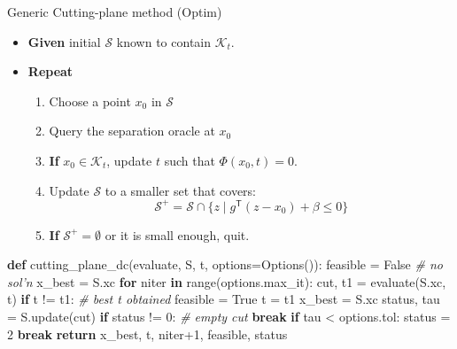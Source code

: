 \documentclass[
  ignorenonframetext,
  aspectratio=169,
  serif,onlymath]{beamer}
\newenvironment{Shaded}{}{}
\newcommand{\BuiltInTok}[1]{#1}
\newcommand{\CommentTok}[1]{\textcolor[rgb]{0.38,0.63,0.69}{\textit{#1}}}
\newcommand{\ControlFlowTok}[1]{\textcolor[rgb]{0.00,0.44,0.13}{\textbf{#1}}}
\newcommand{\DecValTok}[1]{\textcolor[rgb]{0.25,0.63,0.44}{#1}}
\newcommand{\KeywordTok}[1]{\textcolor[rgb]{0.00,0.44,0.13}{\textbf{#1}}}
\newcommand{\NormalTok}[1]{#1}
\newcommand{\OperatorTok}[1]{\textcolor[rgb]{0.40,0.40,0.40}{#1}}
\newcommand{\VariableTok}[1]{\textcolor[rgb]{0.10,0.09,0.49}{#1}}
\providecommand{\tightlist}{%
  \setlength{\itemsep}{0pt}\setlength{\parskip}{0pt}}
\begin{document}
\begin{frame}{Generic Cutting-plane method (Optim)}
\protect\hypertarget{generic-cutting-plane-method-optim}{}

\begin{itemize}
\tightlist
\item
  \textbf{Given} initial \(\mathcal{S}\) known to contain
  \(\mathcal{K}_t\).
\item
  \textbf{Repeat}

  \begin{enumerate}
  \tightlist
  \item
    Choose a point \(x_0\) in \(\mathcal{S}\)
  \item
    Query the separation oracle at \(x_0\)
  \item
    \textbf{If} \(x_0 \in \mathcal{K}_t\), update \(t\) such that
    \(\Phi(x_0, t) = 0\).
  \item
    Update \(\mathcal{S}\) to a smaller set that covers:
    \[\mathcal{S}^+ = \mathcal{S} \cap \{z \mid g^\mathsf{T} (z - x_0) + \beta \le 0\} \]
  \item
    \textbf{If} \(\mathcal{S}^+ = \emptyset\) or it is small enough,
    quit.
  \end{enumerate}
\end{itemize}

\end{frame}

\begin{frame}[fragile]

\scriptsize

\begin{Shaded}
\begin{Highlighting}[]
\KeywordTok{def}\NormalTok{ cutting_plane_dc(evaluate, S, t, options}\OperatorTok{=}\NormalTok{Options()):}
\NormalTok{    feasible }\OperatorTok{=} \VariableTok{False}  \CommentTok{# no sol'n}
\NormalTok{    x_best }\OperatorTok{=}\NormalTok{ S.xc}
    \ControlFlowTok{for}\NormalTok{ niter }\KeywordTok{in} \BuiltInTok{range}\NormalTok{(options.max_it):}
\NormalTok{        cut, t1 }\OperatorTok{=}\NormalTok{ evaluate(S.xc, t)}
        \ControlFlowTok{if}\NormalTok{ t }\OperatorTok{!=}\NormalTok{ t1:  }\CommentTok{# best t obtained}
\NormalTok{            feasible }\OperatorTok{=} \VariableTok{True}
\NormalTok{            t }\OperatorTok{=}\NormalTok{ t1}
\NormalTok{            x_best }\OperatorTok{=}\NormalTok{ S.xc}
\NormalTok{        status, tau }\OperatorTok{=}\NormalTok{ S.update(cut)}
        \ControlFlowTok{if}\NormalTok{ status }\OperatorTok{!=} \DecValTok{0}\NormalTok{:  }\CommentTok{# empty cut}
            \ControlFlowTok{break}
        \ControlFlowTok{if}\NormalTok{ tau }\OperatorTok{<}\NormalTok{ options.tol:}
\NormalTok{            status }\OperatorTok{=} \DecValTok{2}
            \ControlFlowTok{break}
    \ControlFlowTok{return}\NormalTok{ x_best, t, niter}\OperatorTok{+}\DecValTok{1}\NormalTok{, feasible, status}
\end{Highlighting}
\end{Shaded}

\end{frame}
\end{document}
